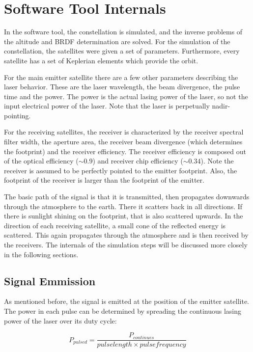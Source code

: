 \section{Software Tool Internals}
\label{SoftwareToolInternals}

In the software tool, the constellation is simulated, and the inverse problems of the altitude and BRDF determination are solved. For the simulation of the constellation, the satellites were given a set of parameters. Furthermore, every satellite has a set of Keplerian elements which provide the orbit. 

For the main emitter satellite there are a few other parameters describing the laser behavior. These are the laser wavelength, the beam divergence, the pulse time and the power. The power is the actual lasing power of the laser, so not the input electrical power of the laser. Note that the laser is perpetually nadir-pointing.

For the receiving satellites, the receiver is characterized by the receiver spectral filter width, the aperture area, the receiver beam divergence (which determines the footprint) and the receiver efficiency. The receiver efficiency is composed out of the optical efficiency ($\sim0.9$) and receiver chip efficiency ($\sim0.34$). Note the receiver is assumed to be perfectly pointed to the emitter footprint. Also, the footprint of the receiver is larger than the footprint of the emitter.

The basic path of the signal is that it is transmitted, then propagates downwards through the atmosphere to the earth. There it scatters back in all directions. If there is sunlight shining on the footprint, that is also scattered upwards. In the direction of each receiving satellite, a small cone of the reflected energy is scattered. This again propagates through the atmosphere and is then received by the receivers. The internals of the simulation steps will be discussed more closely in the following sections.

\subsection{Signal Emmission}
As mentioned before, the signal is emitted at the position of the emitter satellite. The power in each pulse can be determined by spreading the continuous lasing power of the laser over its duty cycle:

\begin{equation}
	P_{pulsed} =  \frac{P_{continues}}{pulse length \times pulse frequency}
\end{equation}

